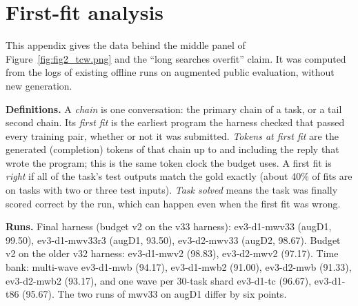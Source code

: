 \section{First-fit analysis}\label{app:firstfit}

This appendix gives the data behind the middle panel of Figure~\ref{fig:fig2_tcw.png} and the ``long searches overfit'' claim. It was computed from the logs of existing offline runs on augmented public evaluation, without new generation.

\textbf{Definitions.} A \emph{chain} is one conversation: the primary chain of a task, or a tail second chain. Its \emph{first fit} is the earliest program the harness checked that passed every training pair, whether or not it was submitted. \emph{Tokens at first fit} are the generated (completion) tokens of that chain up to and including the reply that wrote the program; this is the same token clock the budget uses. A first fit is \emph{right} if all of the task's test outputs match the gold exactly (about 40\% of fits are on tasks with two or three test inputs). \emph{Task solved} means the task was finally scored correct by the run, which can happen even when the first fit was wrong.

\textbf{Runs.} Final harness (budget v2 on the v33 harness): ev3-d1-mwv33 (augD1, 99.50), ev3-d1-mwv33r3 (augD1, 93.50), ev3-d2-mwv33 (augD2, 98.67). Budget v2 on the older v32 harness: ev3-d1-mwv2 (98.83), ev3-d2-mwv2 (97.17). Time bank: multi-wave ev3-d1-mwb (94.17), ev3-d1-mwb2 (91.00), ev3-d2-mwb (91.33), ev3-d2-mwb2 (93.17), and one wave per 30-task shard ev3-d1-tc (96.67), ev3-d1-t86 (95.67). The two runs of mwv33 on augD1 differ by six points.

\begin{table}[H]\centering\small
{}
\caption{Share of first train-passing programs that are right on the test, by generated tokens before they were found. 95\% Wilson intervals for the final harness: [80, 98], [57, 81], [67, 83], [46, 64], [17, 44].}\label{tab:ff}
\end{table}

